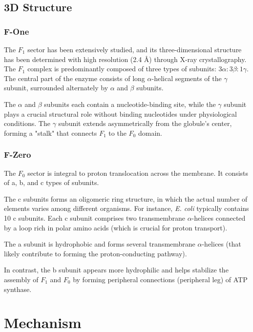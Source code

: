 \documentclass{article}
\begin{document}
\subsection{3D Structure}

\subsubsection{F-One}

The \textit{$F_1$} sector has been extensively studied, and its three-dimensional structure has been determined with high resolution (2.4 Å) through X-ray crystallography. The \textit{$F_1$} complex is predominantly composed of three types of subunits: $3\alpha : 3\beta : 1\gamma$. The central part of the enzyme consists of long $\alpha$-helical segments of the $\gamma$ subunit, surrounded alternately by $\alpha$ and $\beta$ subunits.

The $\alpha$ and $\beta$ subunits each contain a nucleotide-binding site, while the $\gamma$ subunit plays a crucial structural role without binding nucleotides under physiological conditions. The $\gamma$ subunit extends asymmetrically from the globule's center, forming a "stalk" that connects \textit{$F_1$} to the \textit{$F_0$} domain.

\subsubsection{F-Zero}

The \textit{$F_0$} sector is integral to proton translocation across the membrane. It consists of a, b, and c types of subunits.

The c subunits forms an oligomeric ring structure, in which the actual number of elements varies among different organisms. For instance, \textit{E. coli} typically contains 10 c subunits. Each c subunit comprises two transmembrane $\alpha$-helices connected by a loop rich in polar amino acids (which is crucial for proton transport).

The a subunit is hydrophobic and forms several transmembrane $\alpha$-helices (that likely contribute to forming the proton-conducting pathway).

In contrast, the b subunit appears more hydrophilic and helps stabilize the assembly of \textit{$F_1$} and \textit{$F_0$} by forming peripheral connections (peripheral leg) of ATP synthase.

\section{Mechanism}
\end{document}
